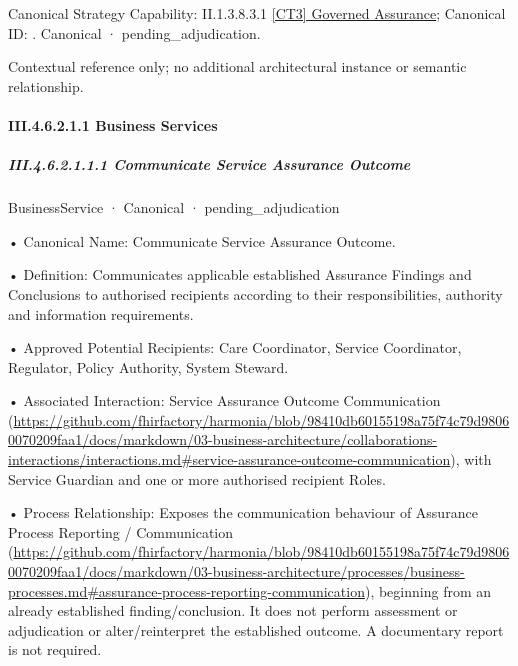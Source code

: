 {\small Canonical Strategy Capability: II.1.3.8.3.1 \hyperref[element:da1a983d4dcf4d5bb772b8f69bc08426]{[CT3] Governed Assurance}; Canonical ID: \texttt{}. Canonical · pending\_adjudication.}\par
Contextual reference only; no additional architectural instance or semantic relationship.\par
\paragraph*{III.4.6.2.1.1 Business Services}
\label{navigation:III.4.6.2.1.1}

\subparagraph*{III.4.6.2.1.1.1 Communicate Service Assurance Outcome}
\label{navigation:III.4.6.2.1.1.1}

\label{element:371b04d6bbf84b53a3c5667ae6df2809}
{\small BusinessService · Canonical · pending\_adjudication}\par

•
Canonical Name: Communicate Service Assurance Outcome.



•
Definition: Communicates applicable established Assurance Findings and Conclusions to authorised recipients according to their responsibilities, authority and information requirements.



•
Approved Potential Recipients: Care Coordinator, Service Coordinator, Regulator, Policy Authority, System Steward.



•
Associated Interaction: Service Assurance Outcome Communication (\url{https://github.com/fhirfactory/harmonia/blob/98410db60155198a75f74c79d98060070209faa1/docs/markdown/03-business-architecture/collaborations-interactions/interactions.md#service-assurance-outcome-communication}), with Service Guardian and one or more authorised recipient Roles.



•
Process Relationship: Exposes the communication behaviour of Assurance Process Reporting / Communication (\url{https://github.com/fhirfactory/harmonia/blob/98410db60155198a75f74c79d98060070209faa1/docs/markdown/03-business-architecture/processes/business-processes.md#assurance-process-reporting-communication}), beginning from an already established finding/conclusion. It does not perform assessment or adjudication or alter/reinterpret the established outcome. A documentary report is not required.



